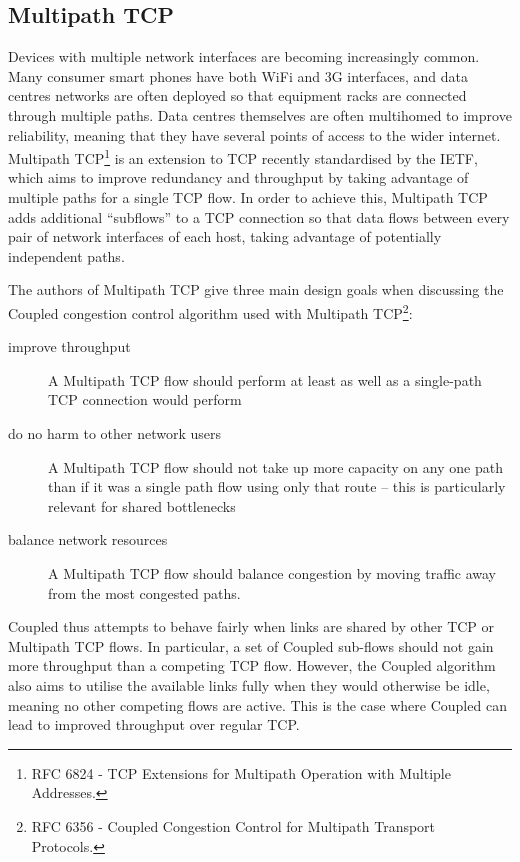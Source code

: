 \subsection{Multipath TCP}
\label{sec:bg:mptcp}
Devices with multiple network interfaces are becoming increasingly common. Many consumer
smart phones have both WiFi and 3G interfaces, and data centres networks are
often deployed so that equipment racks are connected through multiple paths.
Data centres themselves are often multihomed to improve reliability, meaning
that they have several points of access to the wider internet. Multipath
TCP\footnote{RFC 6824 - TCP Extensions for Multipath Operation with Multiple
Addresses.} is an extension to TCP recently standardised by the IETF, which aims
to improve redundancy and throughput by taking advantage of multiple paths for a
single TCP flow. In order to achieve this, Multipath TCP adds additional
``subflows'' to a TCP connection so that data flows between every pair of
network interfaces of each host, taking advantage of potentially independent
paths.


The authors of Multipath TCP give three main design goals when discussing the
Coupled congestion control algorithm used with Multipath TCP\footnote{RFC 6356 - Coupled Congestion Control for
Multipath Transport Protocols.}:

\begin{description}
  \item[improve throughput] A Multipath TCP flow should perform at least as well
    as a single-path TCP connection would perform
  \item[do no harm to other network users] A Multipath TCP flow should not take
    up more capacity on any one path than if it was a single path flow using
    only that route -- this is particularly relevant for shared bottlenecks
  \item[balance network resources] A Multipath TCP flow should balance congestion by moving
    traffic away from the most congested paths.
\end{description}

Coupled thus attempts to behave fairly when links are shared by other TCP or
Multipath TCP flows. In particular, a set of Coupled sub-flows should not gain
more throughput than a competing TCP flow. However, the Coupled algorithm also
aims to utilise the available
links fully when they would otherwise be idle, meaning no other competing flows
are active. This is the case where Coupled can lead to improved throughput over
regular TCP.

